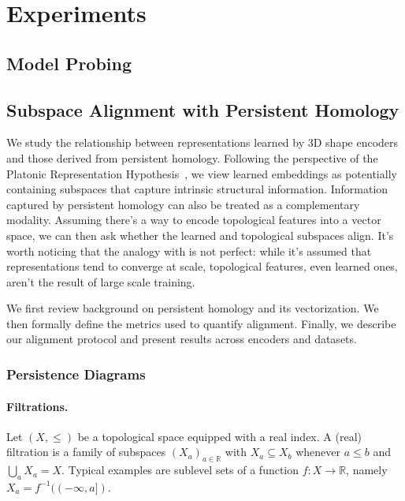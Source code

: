 \section{Experiments}
\label{sec:experiments}

\subsection{Model Probing}
\label{ssec:model_probing}


\subsection{Subspace Alignment with Persistent Homology}
\label{ssec:ph}

We study the relationship between representations learned by 3D shape encoders and those derived from persistent homology. Following the perspective of the Platonic Representation Hypothesis~\cite{plato,platonic}, we view learned embeddings as potentially containing subspaces that capture intrinsic structural information. Information captured by persistent homology can also be treated as a complementary modality. Assuming there's a way to encode topological features into a vector space, we can then ask whether the learned and topological subspaces align. It's worth noticing that the analogy with \cite{platonic} is not perfect: while it's assumed that representations tend to converge at scale, topological features, even learned ones, aren't the result of large scale training.

We first review background on persistent homology and its vectorization. We then formally define the metrics used to quantify alignment. Finally, we describe our alignment protocol and present results across encoders and datasets.


\subsubsection{Persistence Diagrams}
\label{sssec:persistence_diagrams}


\paragraph{Filtrations.}
Let $(X, \leq)$ be a topological space equipped with a real index. A (real) filtration is a family of subspaces $(X_a)_{a\in\mathbb{R}}$ with $X_a \subseteq X_b$ whenever $a \leq b$ and $\bigcup_a X_a = X$. Typical examples are sublevel sets of a function $f:X\to\mathbb{R}$, namely $X_a = f^{-1}((-\infty,a])$.

